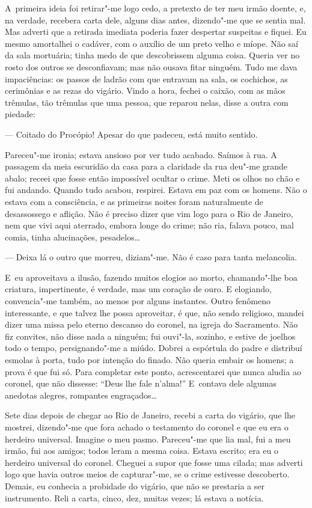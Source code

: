 \begin{linenumbers}
A~primeira ideia foi retirar"-me logo cedo, a pretexto de ter meu irmão
doente, e, na verdade, recebera carta dele, alguns dias antes,
dizendo"-me que se sentia mal. Mas adverti que a retirada imediata
poderia fazer despertar suspeitas e fiquei. Eu mesmo amortalhei o
cadáver, com o auxílio de um preto velho e míope. Não saí da sala
mortuária; tinha medo de que descobrissem alguma coisa. Queria ver no
rosto dos outros se desconfiavam; mas não ousava fitar ninguém. Tudo me
dava impaciências: os passos de ladrão com que entravam na sala, os
cochichos, as cerimônias e as rezas do vigário. Vindo a hora, fechei o
caixão, com as mãos trêmulas, tão trêmulas que uma pessoa, que reparou
nelas, disse a outra com piedade:

--- Coitado do Procópio! Apesar do que padeceu, está muito sentido.

Pareceu"-me ironia; estava ansioso por ver tudo acabado. Saímos à rua. A
passagem da meia escuridão da casa para a claridade da rua deu"-me grande
abalo; receei que fosse então impossível ocultar o crime. Meti os olhos
no chão e fui andando. Quando tudo acabou, respirei. Estava em paz com
os homens. Não o estava com a consciência, e as primeiras noites foram
naturalmente de desassossego e aflição. Não é preciso dizer que vim logo
para o Rio de Janeiro, nem que vivi aqui aterrado, embora longe do
crime; não ria, falava pouco, mal comia, tinha alucinações, pesadelos\ldots{}

--- Deixa lá o outro que morreu, diziam"-me. Não é caso para tanta
melancolia.

E~eu aproveitava a ilusão, fazendo muitos elogios ao morto, chamando"-lhe
boa criatura, impertinente, é verdade, mas um coração de ouro. E
elogiando, convencia"-me também, ao menos por alguns instantes. Outro
fenômeno interessante, e que talvez lhe possa aproveitar, é que, não
sendo religioso, mandei dizer uma missa pelo eterno descanso do coronel,
na igreja do Sacramento. Não fiz convites, não disse nada a ninguém; fui
ouvi"-la, sozinho, e estive de joelhos todo o tempo, persignando"-me a
miúdo. Dobrei a espórtula do padre e distribuí esmolas à porta, tudo por
intenção do finado. Não queria embair os homens; a prova é que fui só.
Para completar este ponto, acrescentarei que nunca aludia ao coronel,
que não dissesse: ``Deus lhe fale n'alma!'' E~contava dele algumas
anedotas alegres, rompantes engraçados\ldots{}

Sete dias depois de chegar ao Rio de Janeiro, recebi a carta do vigário,
que lhe mostrei, dizendo"-me que fora achado o testamento do coronel e
que eu era o herdeiro universal. Imagine o meu pasmo. Pareceu"-me que lia
mal, fui a meu irmão, fui aos amigos; todos leram a mesma coisa. Estava
escrito; era eu o herdeiro universal do coronel. Cheguei a supor que
fosse uma cilada; mas adverti logo que havia outros meios de
capturar"-me, se o crime estivesse descoberto. Demais, eu conhecia a
probidade do vigário, que não se prestaria a ser instrumento. Reli a
carta, cinco, dez, muitas vezes; lá estava a notícia.


\end{linenumbers}
